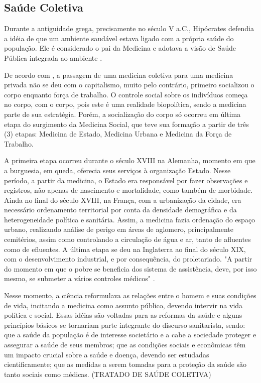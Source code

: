 \subsection{Saúde Coletiva}

\indent Durante a antiguidade grega, precisamente no século V a.C., Hipócrates defendia a idéia de que um ambiente saudável estava ligado com a própria saúde do população. Ele é considerado o pai da Medicina e adotava a visão de Saúde Pública integrada ao ambiente \cite{CFMVSaude}.

\indent De acordo com , a passagem de uma medicina coletiva para uma medicina privada não se deu com o capitalismo, muito pelo contrário, primeiro socializou o corpo enquanto força de trabalho. O controle social sobre os indivíduos começa no corpo, com o corpo, pois este é uma realidade biopolítica, sendo a medicina parte de sua estratégia. Porém, a socialização do corpo só ocorreu em última etapa do surgimento da Medicina Social, que teve sua formação a partir de três (3) etapas: Medicina de Estado, Medicina Urbana e Medicina da Força de Trabalho.

\indent A primeira etapa ocorreu durante o século XVIII na Alemanha, momento em que a burguesia, em queda, oferecia seus serviços à organização Estado. Nesse período, a partir da medicina, o Estado era responsável por fazer observações e registros, não apenas de nascimento e mortalidade, como também de morbidade. Ainda no final do século XVIII, na França, com a urbanização da cidade, era necessário ordenamento territorial por conta da densidade demográfica e da heterogeneidade política e sanitária. Assim, a medicina fazia ordenação do espaço urbano, realizando análise de perigo em áreas de aglomero, principalmente cemitérios, assim como controlando a circulação de água e ar, tanto de afluentes como de efluentes. A última etapa se deu na Inglaterra ao final do século XIX, com o desenvolvimento industrial, e por consequência, do proletariado. "A partir do momento em que o pobre se beneficia dos sistema de assistência, deve, por isso mesmo, se submeter a vários controles médicos" \cite{Foucault1990Microfisica}.

\indent Nesse momento, a ciência reformulava as relações entre o homem e suas condições de vida, incitando a medicina como assunto público, devendo intervir na vida política e social.
Essas idéias são voltadas para as reformas da saúde e alguns princípios básicos se
tornariam parte integrante do discurso sanitarista, sendo: que a saúde da população é de interesse societário e a cabe a sociedade proteger e assegurar a saúde de seus membros; que as condições sociais e econômicas têm um impacto crucial sobre a saúde e doença, devendo ser estudadas cientificamente; que as medidas a serem tomadas para a proteção da saúde são tanto sociais como médicas. (TRATADO DE SAÚDE COLETIVA)


